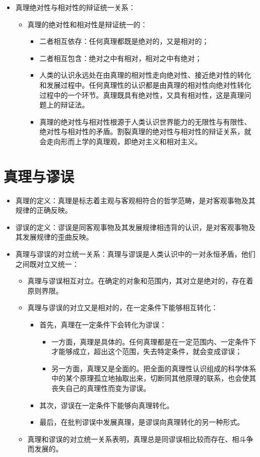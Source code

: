 \documentclass[12pt,openany]{ctexbook}
\begin{document}
\begin{itemize}
\begin{itemize}
  \item 因此，任何真理都只能是主观对客观事物近似正确即相对正确的反映。
\end{itemize}
  \item 真理绝对性与相对性的辩证统一关系：
\begin{itemize}
  \item 真理的绝对性和相对性是辩证统一的：
\begin{itemize}
  \item 二者相互依存：任何真理都既是绝对的，又是相对的；
  \item 二者相互包含：绝对之中有相对，相对之中有绝对；
  \item 人类的认识永远处在由真理的相对性走向绝对性、接近绝对性的转化和发展过程中。任何真理性的认识都是由真理的相对性向绝对性转化过程中的一个环节。真理既具有绝对性，又具有相对性，这是真理问题上的辩证法。
  \item 真理的绝对性与相对性根源于人类认识世界能力的无限性与有限性、绝对性与相对性的矛盾。割裂真理的绝对性与相对性的辩证关系，就会走向形而上学的真理观，即绝对主义和相对主义。
\end{itemize}
\end{itemize}
\end{itemize}
\section{真理与谬误}
\begin{itemize}
  \item 真理的定义：真理是标志着主观与客观相符合的哲学范畴，是对客观事物及其规律的正确反映。
  \item 谬误的定义：谬误是同客观事物及其发展规律相违背的认识，是对客观事物及其发展规律的歪曲反映。
  \item 真理与谬误的对立统一关系：真理与谬误是人类认识中的一对永恒矛盾，他们之间既对立又统一：
\begin{itemize}
  \item 真理与谬误相互对立。在确定的对象和范围内，其对立是绝对的，存在着原则界限。
  \item 真理与谬误的对立又是相对的，在一定条件下能够相互转化：
\begin{itemize}
  \item 首先，真理在一定条件下会转化为谬误：
\begin{itemize}
  \item 一方面，真理是具体的。任何真理都是在一定范围内、一定条件下才能够成立，超出这个范围，失去特定条件，就会变成谬误；
  \item 另一方面，真理又是全面的。把全面的真理性认识组成的科学体系中的某个原理孤立地抽取出来，切断同其他原理的联系，也会使其丧失自己的真理性而变为谬误。
\end{itemize}
  \item 其次，谬误在一定条件下能够向真理转化。
  \item 最后，在批判谬误中发展真理，是谬误向真理转化的另一种形式。
\end{itemize}
  \item 真理和谬误的对立统一关系表明，真理总是同谬误相比较而存在、相斗争而发展的。
\end{itemize}
\end{itemize}
\end{document}
